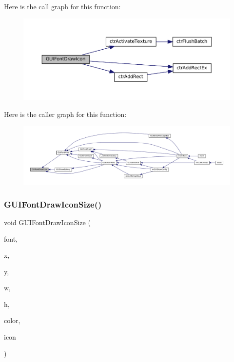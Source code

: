 Here is the call graph for this function\+:
\nopagebreak
\begin{figure}[H]
\begin{center}
\leavevmode
\includegraphics[width=350pt]{3ds_2gui-font_8c_a89adf10a0ec4d3b2dfba92b95ab17ad5_cgraph}
\end{center}
\end{figure}
Here is the caller graph for this function\+:
\nopagebreak
\begin{figure}[H]
\begin{center}
\leavevmode
\includegraphics[width=350pt]{3ds_2gui-font_8c_a89adf10a0ec4d3b2dfba92b95ab17ad5_icgraph}
\end{center}
\end{figure}
\mbox{\label{3ds_2gui-font_8c_ae9ac7ef646aad8e77b04baf500472178}} 
\subsubsection{\texorpdfstring{G\+U\+I\+Font\+Draw\+Icon\+Size()}{GUIFontDrawIconSize()}}
{\footnotesize\ttfamily void G\+U\+I\+Font\+Draw\+Icon\+Size (\begin{DoxyParamCaption}\item[{const struct G\+U\+I\+Font $\ast$}]{font,  }\item[{\mbox{\hyperlink{ioapi_8h_a787fa3cf048117ba7123753c1e74fcd6}{int}}}]{x,  }\item[{\mbox{\hyperlink{ioapi_8h_a787fa3cf048117ba7123753c1e74fcd6}{int}}}]{y,  }\item[{\mbox{\hyperlink{ioapi_8h_a787fa3cf048117ba7123753c1e74fcd6}{int}}}]{w,  }\item[{\mbox{\hyperlink{ioapi_8h_a787fa3cf048117ba7123753c1e74fcd6}{int}}}]{h,  }\item[{uint32\+\_\+t}]{color,  }\item[{enum G\+U\+I\+Icon}]{icon }\end{DoxyParamCaption})}

